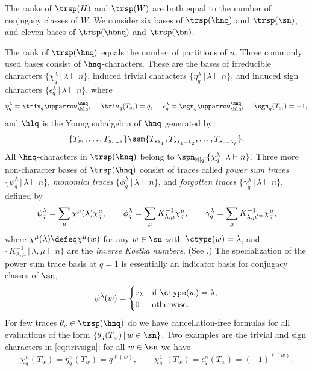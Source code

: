 The ranks of $\trsp(H)$ and $\trsp(W)$ are both equal to
the number of conjugacy classes of $W$.
We consider six bases of $\trsp(\hnq)$ and $\trsp(\sn)$,
and eleven bases of $\trsp(\hbnq)$ and $\trsp(\bn)$.

\label{ss:snhnq}

The rank of $\trsp(\hnq)$ equals the number of partitions of $n$.
Three commonly used bases
consist of $\hnq$-characters.
These are the bases of
irreducible characters $\{ \chi_q^\lambda \,|\, \lambda \vdash n \}$,
induced trivial characters $\{ \eta_q^\lambda \,|\, \lambda \vdash n \}$,
and induced sign characters $\{ \epsilon_q^\lambda \,|\, \lambda \vdash n \}$,
where
\begin{equation}\label{eq:trivsign}
\eta_q^\lambda = \triv_q \upparrow_{\hlq}^{\hnq},
\ \quad \triv_q(T_{s_i}) = q,
  \ \quad \epsilon_q^\lambda = \sgn_q \upparrow_{\hlq}^{\hnq},
  \ \quad \sgn_q(T_{s_i}) = -1,
\end{equation}
and $\hlq$ is the Young subalgebra of $\hnq$ generated by
\begin{equation*}
  \{ T_{s_1}, \dotsc, T_{s_{n-1}} \} \ssm
  \{ T_{s_{\lambda_1}}, T_{s_{\lambda_1 + \lambda_2}}, \dotsc, T_{s_{n-\lambda_\ell}} \}.
\end{equation*}
All $\hnq$-characters in $\trsp(\hnq)$ belong to $\spn_{\mathbb N[q]}\{ \chi_q^\lambda \,|\, \lambda \vdash n\}$. 
Three more non-character bases of $\trsp(\hnq)$ consist of traces
called
{\em power sum traces} $\{ \psi_q^\lambda \,|\, \lambda \vdash n \}$,
{\em monomial traces} $\{ \phi_q^\lambda \,|\, \lambda \vdash n \}$, and
{\em forgotten traces} $\{ \gamma_q^\lambda \,|\, \lambda \vdash n \}$,
defined by
\begin{equation*}
  \psi_q^\lambda = \sum_\mu \chi^\mu(\lambda) \chi_q^\mu,
  \qquad
  \phi_q^\lambda = \sum_\mu K^{-1}_{\lambda,\mu} \chi_q^\mu,
  \qquad
  \gamma_q^\lambda = \sum_\mu K^{-1}_{\lambda,\mu^\tr} \chi_q^\mu,
\end{equation*}
where $\chi^\mu(\lambda) \defeq \chi^\mu(w)$
for any $w \in \sn$ with $\ctype(w) = \lambda$,
and $\{K^{-1}_{\lambda,\mu} \,|\, \lambda,\mu \vdash n \}$ are the {\em inverse
Kostka numbers}.  (See \cite[\S 7]{StanEC2}.)
The specialization of the power sum trace basis at $q=1$
is 
essentially an indicator basis for conjugacy classes of $\sn$,
\begin{equation}\label{eq:psidef}
  \psi^{\lambda}(w) = \begin{cases}
    z_\lambda &\text{if $\ctype(w) = \lambda$},\\
    0       &\text{otherwise}.
  \end{cases}
\end{equation}
For few traces $\theta_q \in \trsp(\hnq)$
do we have cancellation-free formulas for all
evaluations of the form $\{\theta_q(T_w) \,|\, w \in \sn \}$.
Two examples are the trivial and sign characters
in \eqref{eq:trivsign}:
for all $w \in \sn$ we have
\begin{equation*}
  \chi^n_q(T_w) = \eta^n_q(T_w) = q^{\ell(w)}, \qquad
  \chi^{1^n}_q(T_w) = \epsilon^n_q(T_w) = (-1)^{\ell(w)}.
  \end{equation*}

